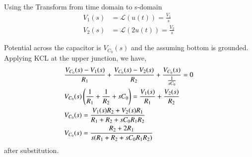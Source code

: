 \documentclass[journal,12pt,twocolumn]{IEEEtran}
\renewcommand\thesection{\arabic{section}}
\begin{document}
\begin{enumerate}[label=\arabic*.,ref=\thesection.\theenumi]
	\solution\\
	Using the Transform from time domain to s-domain
	\begin{align*}
		V_1(s) &= \mathcal{L}(u(t)) = \frac{V_1}{s} \\
		V_2(s) &= \mathcal{L}(2u(t)) = \frac{V_2}{s}
	\end{align*}

	Potential across the capacitor is $V_{C_0}(s)$ and the assuming bottom is grounded. \\
	Applying KCL at the upper junction, we have,
	\begin{align*}
		&\frac{V_{C_0}(s) - V_1(s)}{R_1} + \frac{V_{C_0}(s) - V_2(s)}{R_2} + \frac{V_{C_0}(s)}{\frac{1}{s C_0}} = 0 \\
		&V_{C_0}(s) \left(\frac{1}{R_1} + \frac{1}{R_2} + s C_0\right) = \frac{V_1(s)}{R_1} + \frac{V_2(s)}{R_2} \\
		&V_{C_0}(s) = \frac{V_1(s)R_2 + V_2(s)R_1}{R_1 + R_2 + s C_0 R_1 R_2} \\
		&V_{C_0}(s) = \frac{R_2 + 2R_1}{s(R_1 + R_2 + s C_0 R_1 R_2)} 
	\end{align*}
	after substitution.



\end{enumerate}
\end{document}
